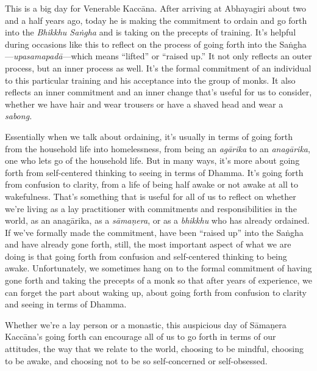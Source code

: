 This is a big day for Venerable Kaccāna. After arriving at Abhayagiri 
about two and a half years ago, today he is making the commitment to 
ordain and go forth into the \emph{Bhikkhu Saṅgha} and is taking on 
the precepts of training. It's helpful during occasions like this to 
reflect on the process of going forth into the 
Saṅgha---\emph{upasamapadā}---which means ``lifted'' or ``raised 
up.'' It not only reflects an outer process, but an inner process as 
well. It's the formal commitment of an individual to this particular 
training and his acceptance into the group of monks. It also reflects 
an inner commitment and an inner change that's useful for us to 
consider, whether we have hair and wear trousers or have a shaved head 
and wear a \emph{sabong.}

Essentially when we talk about ordaining, it's usually in terms of 
going forth from the household life into homelessness, from being an 
\emph{agārika} to an \emph{anagārika}, one who lets go of the 
household life. But in many ways, it's more about going forth from 
self-centered thinking to seeing in terms of Dhamma. It's going forth 
from confusion to clarity, from a life of being half awake or not awake 
at all to wakefulness. That's something that is useful for all of us to 
reflect on whether we're living as a lay practitioner with commitments 
and responsibilities in the world, as an anagārika, as a 
\emph{sāmaṇera}, or as a \emph{bhikkhu} who has already ordained. If 
we've formally made the commitment, have been ``raised up'' into the 
Saṅgha and have already gone forth, still, the most important aspect 
of what we are doing is that going forth from confusion and 
self-centered thinking to being awake. Unfortunately, we sometimes hang 
on to the formal commitment of having gone forth and taking the 
precepts of a monk so that after years of experience, we can forget the 
part about waking up, about going forth from confusion to clarity and 
seeing in terms of Dhamma.

Whether we're a lay person or a monastic, this auspicious day of 
Sāmaṇera Kaccāna's going forth can encourage all of us to go forth 
in terms of our attitudes, the way that we relate to the world, 
choosing to be mindful, choosing to be awake, and choosing not to be so 
self-concerned or self-obsessed.

